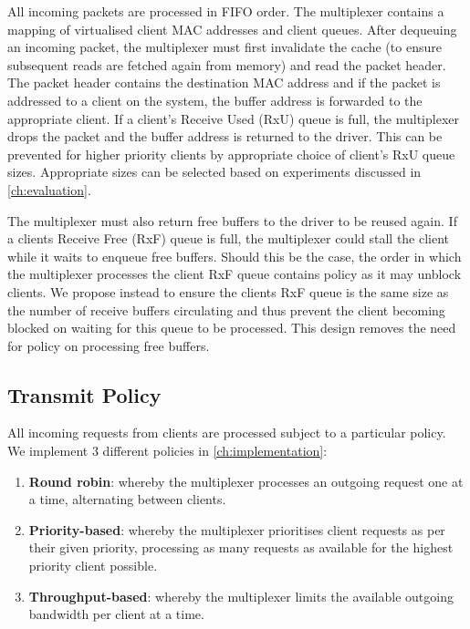 All incoming packets are processed in FIFO order. The multiplexer contains a 
mapping of virtualised client MAC addresses and client queues. After dequeuing an incoming packet,
the multiplexer must first invalidate the cache (to ensure subsequent reads are fetched again from memory)
and read the packet header. The packet header contains the destination MAC address and if the packet is
addressed to a client on the system, the buffer address is forwarded to the appropriate client. 
If a client's Receive Used (RxU) queue is full, the multiplexer drops the packet and the buffer address is returned to
the driver. This can be prevented for higher priority clients by appropriate choice of client's RxU queue
sizes. Appropriate sizes can be selected based on experiments discussed in \autoref{ch:evaluation}.

The multiplexer must also return free buffers to the driver to be reused again. If a clients Receive Free
(RxF) queue is full, the multiplexer could stall the client while it waits to enqueue free buffers. Should this be the case,
the order in which the multiplexer processes the client RxF queue contains policy as it may
unblock clients. We propose instead to ensure the clients RxF queue is the same size as the number
of receive buffers circulating and thus prevent the client becoming blocked on waiting for this queue to be
processed. This design removes the need for policy on processing free buffers. \\ 

\subsection{Transmit Policy}

All incoming requests from clients are processed subject to a particular policy. 
We implement 3 different policies in \autoref{ch:implementation}:
\begin{enumerate}
    \item \textbf{Round robin}: whereby the multiplexer processes an outgoing request one at a time, alternating between clients.
    \item \textbf{Priority-based}: whereby the multiplexer prioritises client requests as per their given priority, processing as many
    requests as available for the highest priority client possible. 
    \item \textbf{Throughput-based}: whereby the multiplexer limits the available outgoing bandwidth per client at a time.
\end{enumerate}

